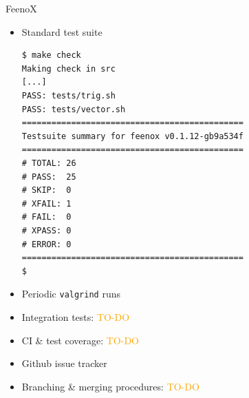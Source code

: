 \documentclass[
  ignorenonframetext,
  aspectratio=169,
]{beamer}
\newcommand{\passthrough}[1]{#1}
\providecommand{\tightlist}{%
  \setlength{\itemsep}{0pt}\setlength{\parskip}{0pt}}
\begin{document}
\begin{frame}[fragile]{}
\begin{columns}[T]
\begin{column}{0.5\textwidth}
\begin{exampleblock}{FeenoX}
\protect\hypertarget{feenox-10}{}
\begin{itemize}
\item
  Standard test suite

\begin{lstlisting}[style=terminal]
$ make check
Making check in src
[...]
PASS: tests/trig.sh
PASS: tests/vector.sh
=============================================
Testsuite summary for feenox v0.1.12-gb9a534f
=============================================
# TOTAL: 26
# PASS:  25
# SKIP:  0
# XFAIL: 1
# FAIL:  0
# XPASS: 0
# ERROR: 0
=============================================
$
\end{lstlisting}
\item
  Periodic \passthrough{\lstinline!valgrind!} runs
\item
  Integration tests: \textcolor{Orange}{TO-DO}
\item
  CI \& test coverage: \textcolor{Orange}{TO-DO}
\end{itemize}

\medskip

\begin{itemize}
\tightlist
\item
  Github issue tracker
\item
  Branching \& merging procedures: \textcolor{Orange}{TO-DO}
\end{itemize}
\end{exampleblock}
\end{column}
\end{columns}
\end{frame}
\end{document}
